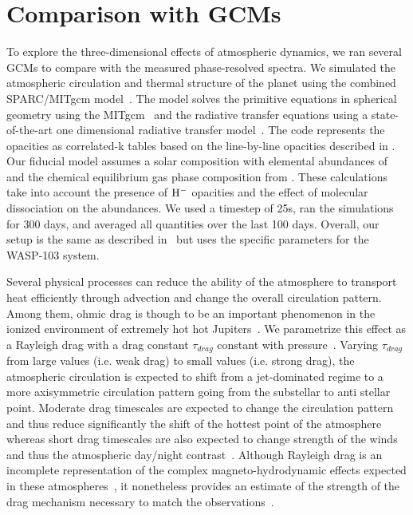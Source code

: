 \documentclass[twocolumn, trackchanges]{aastex61}
\begin{document}
\section{Comparison with GCMs}
\label{sec:gcm}
To explore the three-dimensional effects of atmospheric dynamics, we ran several GCMs to compare with the measured phase-resolved spectra.  We simulated the atmospheric circulation and thermal structure of the planet using the combined SPARC/MITgcm model~\citep{showman09}. The model solves the primitive equations in spherical geometry using the MITgcm~\citep{Adcroft2004} and the radiative transfer equations using a state-of-the-art one dimensional radiative transfer model~\citep{Marley1999}. The code represents the opacities as correlated-k tables based on the line-by-line opacities described in \citet{Visscher2006,freedman14}. Our fiducial model assumes a solar composition with elemental abundances of \citet{Lodders2002a} and the chemical equilibrium gas phase composition from \citet{Visscher2006}. These calculations take into account the presence of $\rm H^-$ opacities and the effect of molecular dissociation on the abundances. We used a timestep of 25s, ran the simulations for 300 days, and averaged all quantities over the last 100 days. Overall, our setup is the same as described in~\citet{parmentier16} but uses the specific parameters for the WASP-103 system.

Several physical processes can reduce the ability of the atmosphere to transport heat efficiently through advection and change the overall circulation pattern. Among them, ohmic drag is though to be an important phenomenon in the ionized environment of extremely hot hot Jupiters~\citep{perna10}. We parametrize this effect as a Rayleigh drag with a drag constant $\tau_{drag}$ constant with pressure~\citep{showman13}. Varying $\tau_{drag}$  from large values (i.e. weak drag) to small values (i.e. strong drag), the atmospheric circulation is expected to shift from a jet-dominated regime to a more axisymmetric circulation pattern going from the substellar to anti stellar point. Moderate drag timescales are expected to change the circulation pattern and thus reduce significantly the shift of the hottest point of the atmosphere whereas short drag timescales are also expected to change strength of the winds and thus the atmospheric day/night contrast~\citep{komacek16,komacek17}.  Although Rayleigh drag is an incomplete representation of the complex magneto-hydrodynamic effects expected in these atmospheres~\citep{batygin13,rogers14,rogers14a,rogers17}, it nonetheless provides an estimate of the strength of the drag mechanism necessary to match the observations~\citep{komacek17,koll18,parmentier17}. 
\end{document}
